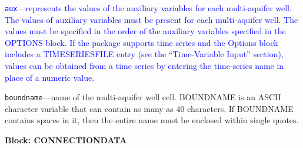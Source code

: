 \begin{description}
\item \textcolor{blue}{\texttt{aux}---represents the values of the auxiliary variables for each multi-aquifer well. The values of auxiliary variables must be present for each multi-aquifer well. The values must be specified in the order of the auxiliary variables specified in the OPTIONS block.  If the package supports time series and the Options block includes a TIMESERIESFILE entry (see the ``Time-Variable Input'' section), values can be obtained from a time series by entering the time-series name in place of a numeric value.}

\item \texttt{boundname}---name of the multi-aquifer well cell.  BOUNDNAME is an ASCII character variable that can contain as many as 40 characters.  If BOUNDNAME contains spaces in it, then the entire name must be enclosed within single quotes.

\end{description}
\item \textbf{Block: CONNECTIONDATA}

